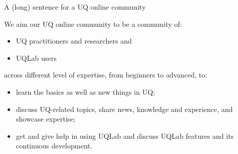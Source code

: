 \documentclass[]{rsuqbeamernew}
\newcommand{\tabitem}{~~\llap{\textbullet}~~}
\begin{document}
\begin{frame}[t]{A (long) sentence for a UQ online community}

We aim our UQ online community to be a community of:

\begin{itemize}
  \item UQ practitioners and researchers and
  \item UQLab users
\end{itemize}

across different level of expertise, from beginners to advanced, to:

\begin{itemize}
  \item learn the basics as well as new things in UQ;
  \item discuss UQ-related topics, share news, knowledge and experience, and showcase expertise;
  \item get and give help in using UQLab and discuss UQLab features and its continuous development.
\end{itemize}

  
  
  


\end{frame}
\end{document}
